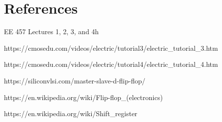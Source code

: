 \documentclass{article}
\begin{document}
\newpage
\section{References}

\noindent [\text{1}] EE 457 Lectures 1, 2, 3, and 4h

\noindent [\text{2}] https://cmosedu.com/videos/electric/tutorial3/electric\_tutorial\_3.htm 

\noindent [\text{3}] https://cmosedu.com/videos/electric/tutorial4/electric\_tutorial\_4.htm 

\noindent [\text{4}] https://siliconvlsi.com/master-slave-d-flip-flop/

\noindent [\text{5}] https://en.wikipedia.org/wiki/Flip-flop\_(electronics)

\noindent [\text{6}] https://en.wikipedia.org/wiki/Shift\_register
\end{document}
